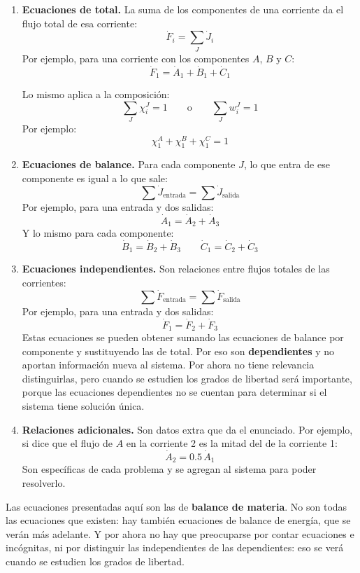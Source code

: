 \begin{enumerate}
    \item \textbf{Ecuaciones de total.} La suma de los componentes
    de una corriente da el flujo total de esa corriente:
    \[
    \dot{F}_i = \sum_J \dot{J}_i
    \]
    Por ejemplo, para una corriente con los componentes $A$, $B$ y
    $C$:
    \[
    \dot{F}_1 = \dot{A}_1 + \dot{B}_1 + \dot{C}_1
    \]

    Lo mismo aplica a la composición:
    \[
    \sum_J \chi_i^J = 1
    \qquad \text{o} \qquad
    \sum_J w_i^J = 1
    \]
    Por ejemplo:
    \[
    \chi_1^A + \chi_1^B + \chi_1^C = 1
    \]

    \item \textbf{Ecuaciones de balance.} Para cada componente $J$,
    lo que entra de ese componente es igual a lo que sale:
    \[
    \sum \dot{J}_{\text{entrada}} = \sum \dot{J}_{\text{salida}}
    \]
    Por ejemplo, para una entrada y dos salidas:
    \[
    \dot{A}_1 = \dot{A}_2 + \dot{A}_3
    \]
    Y lo mismo para cada componente:
    \[
    \dot{B}_1 = \dot{B}_2 + \dot{B}_3
    \qquad
    \dot{C}_1 = \dot{C}_2 + \dot{C}_3
    \]

    \item \textbf{Ecuaciones independientes.} Son relaciones entre
    flujos totales de las corrientes:
    \[
    \sum \dot{F}_{\text{entrada}} = \sum \dot{F}_{\text{salida}}
    \]
    Por ejemplo, para una entrada y dos salidas:
    \[
    \dot{F}_1 = \dot{F}_2 + \dot{F}_3
    \]
    Estas ecuaciones se pueden obtener sumando las ecuaciones de
    balance por componente y sustituyendo las de total. Por eso son
    \textbf{dependientes} y no aportan información nueva al sistema.
    Por ahora no tiene relevancia distinguirlas, pero cuando se
    estudien los grados de libertad será importante, porque las
    ecuaciones dependientes no se cuentan para determinar si el
    sistema tiene solución única.

    \item \textbf{Relaciones adicionales.} Son datos extra que da
    el enunciado. Por ejemplo, si dice que el flujo de $A$ en la
    corriente 2 es la mitad del de la corriente 1:
    \[
    \dot{A}_2 = 0.5\,\dot{A}_1
    \]
    Son específicas de cada problema y se agregan al sistema para
    poder resolverlo.
\end{enumerate}

\begin{notaimportante}
Las ecuaciones presentadas aquí son las de \textbf{balance de
materia}. No son todas las ecuaciones que existen: hay también
ecuaciones de balance de energía, que se verán más adelante. Y por
ahora no hay que preocuparse por contar ecuaciones e incógnitas, ni
por distinguir las independientes de las dependientes: eso se verá
cuando se estudien los grados de libertad.
\end{notaimportante}

